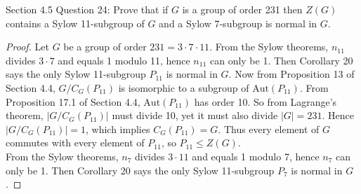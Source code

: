 Section 4.5 Question 24: Prove that if $G$ is a group of order 231 then
$Z(G)$ contains a Sylow 11-subgroup of $G$ and a Sylow 7-subgroup is normal
in $G$.

\begin{proof}
  Let $G$ be a group of order $231=3\cdot7\cdot11$. From the Sylow
  theorems, $n_{11}$ divides $3\cdot7$ and equals 1 modulo 11, hence
  $n_{11}$ can only be 1. Then Corollary 20 says the only Sylow 11-subgroup
  $P_{11}$ is normal in $G$. Now from Proposition 13 of Section 4.4,
  $G/C_G(P_{11})$ is isomorphic to a subgroup of $\text{Aut}(P_{11})$. From
  Proposition 17.1 of Section 4.4, $\text{Aut}(P_{11})$ has order 10. So
  from Lagrange's theorem, $|G/C_G(P_{11})|$ must divide 10, yet it must
  also divide $|G|=231$. Hence $|G/C_G(P_{11})|=1$, which implies
  $C_G(P_{11})=G$. Thus every element of $G$ commutes with every element of
  $P_{11}$, so $P_{11}\leq Z(G)$. \\

  From the Sylow theorems, $n_{7}$ divides $3\cdot11$ and equals 1 modulo
  7, hence $n_{7}$ can only be 1. Then Corollary 20 says the only Sylow
  11-subgroup $P_{7}$ is normal in $G$. 
\end{proof}
